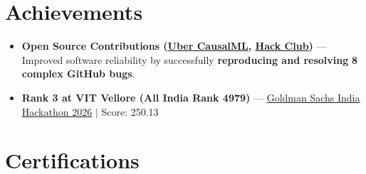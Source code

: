 \documentclass[a4paper,10pt]{article}
\newcommand{\ulink}[2]{\href{#1}{\uline{#2}}}
\begin{document}
\vspace{2pt}

\section{Achievements}
\vspace{2pt}
\begin{itemize}[nosep, leftmargin=1.5em, itemsep=1pt, topsep=2pt]
  \item {\color[HTML]{0A0A0A}\fontsize{11}{14}\selectfont \textbf{Open Source Contributions (\ulink{https://github.com/uber/causalml}{Uber CausalML}, \ulink{https://github.com/hackclub/stardance}{Hack Club})} --- Improved software reliability by successfully \textbf{reproducing and resolving} \textbf{8 complex GitHub bugs}.}
  \item {\color[HTML]{0A0A0A}\fontsize{11}{14}\selectfont \textbf{Rank 3 at VIT Vellore (All India Rank 4979)} --- \ulink{https://www.hackerrank.com/contests/goldman-sachs-india-hackathon-2026-cs/leaderboard}{Goldman Sachs India Hackathon 2026} $|$ Score: 250.13}
\end{itemize}

\vspace{2pt}

\section{Certifications}
\vspace{2pt}
\end{document}
